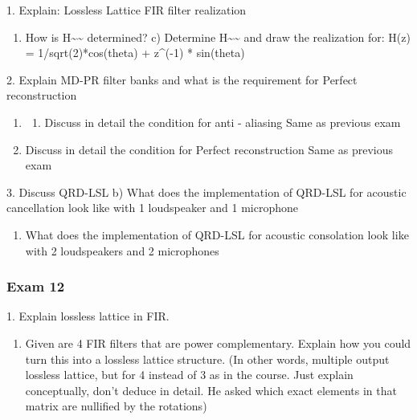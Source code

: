 \documentclass[
  a4paper,
  ,captions=tableheading
]{scrartcl}
\providecommand{\tightlist}{%
  \setlength{\itemsep}{0pt}\setlength{\parskip}{0pt}}
\begin{document}
1. Explain: Lossless Lattice FIR filter realization

\begin{enumerate}
\def\labelenumi{\arabic{enumi}.}
\tightlist
\item
  How is H\textasciitilde\textasciitilde{} determined? c) Determine
  H\textasciitilde\textasciitilde{} and draw the realization for: H(z) =
  1/sqrt(2)*cos(theta) + z\^{}(-1) * sin(theta)
\end{enumerate}

2. Explain MD-PR filter banks and what is the requirement for Perfect
reconstruction

\begin{enumerate}
\def\labelenumi{\arabic{enumi}.}
\tightlist
\item
  \begin{enumerate}
  \def\labelenumii{\alph{enumii})}
  \setcounter{enumii}{1}
  \tightlist
  \item
    Discuss in detail the condition for anti - aliasing Same as previous
    exam\\
  \end{enumerate}
\item
  Discuss in detail the condition for Perfect reconstruction Same as
  previous exam
\end{enumerate}

3. Discuss QRD-LSL b) What does the implementation of QRD-LSL for
acoustic cancellation look like with 1 loudspeaker and 1 microphone

\begin{enumerate}
\def\labelenumi{\arabic{enumi}.}
\tightlist
\item
  What does the implementation of QRD-LSL for acoustic consolation look
  like with 2 loudspeakers and 2 microphones
\end{enumerate}

\subsubsection{Exam 12}\label{exam-12}

1. Explain lossless lattice in FIR.

\begin{enumerate}
\def\labelenumi{\arabic{enumi}.}
\tightlist
\item
  Given are 4 FIR filters that are power complementary. Explain how you
  could turn this into a lossless lattice structure. (In other words,
  multiple output lossless lattice, but for 4 instead of 3 as in the
  course. Just explain conceptually, don't deduce in detail. He asked
  which exact elements in that matrix are nullified by the rotations)
\end{enumerate}
\end{document}
